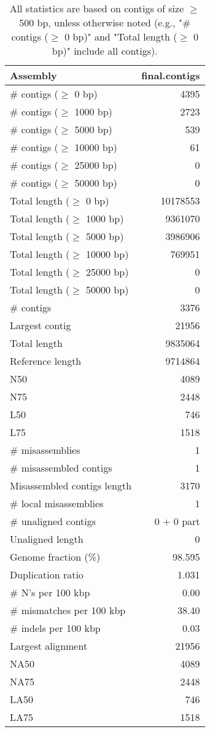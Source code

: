 \documentclass[12pt,a4paper]{article}
\begin{document}
\begin{table}[ht]
\begin{center}
\caption{All statistics are based on contigs of size $\geq$ 500 bp, unless otherwise noted (e.g., "\# contigs ($\geq$ 0 bp)" and "Total length ($\geq$ 0 bp)" include all contigs).}
\begin{tabular}{|l*{1}{|r}|}
\hline
Assembly & final.contigs \\ \hline
\# contigs ($\geq$ 0 bp) & 4395 \\ \hline
\# contigs ($\geq$ 1000 bp) & 2723 \\ \hline
\# contigs ($\geq$ 5000 bp) & 539 \\ \hline
\# contigs ($\geq$ 10000 bp) & 61 \\ \hline
\# contigs ($\geq$ 25000 bp) & 0 \\ \hline
\# contigs ($\geq$ 50000 bp) & 0 \\ \hline
Total length ($\geq$ 0 bp) & 10178553 \\ \hline
Total length ($\geq$ 1000 bp) & 9361070 \\ \hline
Total length ($\geq$ 5000 bp) & 3986906 \\ \hline
Total length ($\geq$ 10000 bp) & 769951 \\ \hline
Total length ($\geq$ 25000 bp) & 0 \\ \hline
Total length ($\geq$ 50000 bp) & 0 \\ \hline
\# contigs & 3376 \\ \hline
Largest contig & 21956 \\ \hline
Total length & 9835064 \\ \hline
Reference length & 9714864 \\ \hline
N50 & 4089 \\ \hline
N75 & 2448 \\ \hline
L50 & 746 \\ \hline
L75 & 1518 \\ \hline
\# misassemblies & 1 \\ \hline
\# misassembled contigs & 1 \\ \hline
Misassembled contigs length & 3170 \\ \hline
\# local misassemblies & 1 \\ \hline
\# unaligned contigs & 0 + 0 part \\ \hline
Unaligned length & 0 \\ \hline
Genome fraction (\%) & 98.595 \\ \hline
Duplication ratio & 1.031 \\ \hline
\# N's per 100 kbp & 0.00 \\ \hline
\# mismatches per 100 kbp & 38.40 \\ \hline
\# indels per 100 kbp & 0.03 \\ \hline
Largest alignment & 21956 \\ \hline
NA50 & 4089 \\ \hline
NA75 & 2448 \\ \hline
LA50 & 746 \\ \hline
LA75 & 1518 \\ \hline
\end{tabular}
\end{center}
\end{table}
\end{document}
